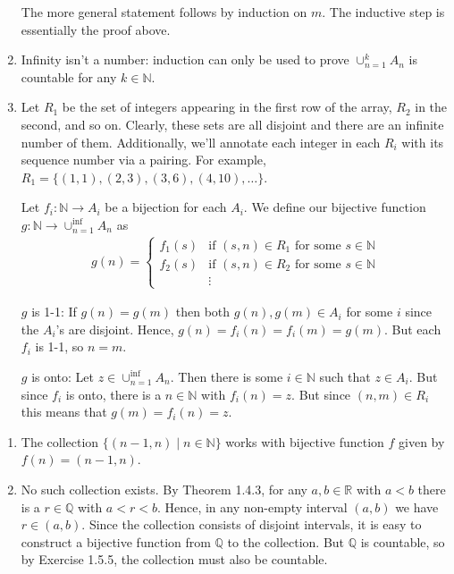 \documentclass[a4paper]{report}
\newenvironment{ex}[1]
    {\noindent{\large \bf Exercise #1.}}{\vspace{0.5cm}}
\begin{document}
\begin{ex}{1.5.3}
\begin{enumerate}[label=\alph*)]
   The more general statement follows by induction on $m$. The inductive step is
   essentially the proof above.
  \item Infinity isn't a number: induction can only be used to prove $\cup_{n=1}^k
    A_n$ is countable for any $k \in \mathbb{N}$.
  \item  Let $R_1$ be the set of integers appearing in the first row of the
    array, $R_2$ in the second, and so on.  Clearly, these sets are all disjoint
    and there are an infinite number of them. Additionally, we'll annotate each
    integer in each $R_i$ with its sequence number via a pairing. For example, $R_1
    = \{ (1, 1), (2, 3), (3, 6), (4, 10), \dots\}$.


    Let $f_i : \mathbb{N} \rightarrow A_i$ be a bijection for each $A_i$. We define our bijective function $g : \mathbb{N} \rightarrow
    \cup_{n=1}^{\inf}A_n$ as
    \begin{align*}
      g(n) = \begin{cases}
        f_1(s) & \text{if $(s, n) \in R_1$ for some $s \in \mathbb{N}$} \\
        f_2(s) & \text{if $(s, n) \in R_2$ for some $s \in \mathbb{N}$} \\
         & \vdots
      \end{cases}
    \end{align*}

  $g$ is 1-1: If $g(n) = g(m)$ then both $g(n),g(m) \in A_i$ for some $i$ since
  the $A_i$'s are disjoint. Hence, $g(n) = f_i(n) = f_i(m) = g(m)$. But each
  $f_i$ is 1-1, so $n = m$.

  $g$ is onto: Let $z \in \cup_{n=1}^{\inf}A_n$. Then there is some $i \in
  \mathbb{N}$ such that $z \in A_i$. But since $f_i$ is onto, there is a $n \in
  \mathbb{N}$ with $f_i(n) = z$. But since $(n, m) \in R_i$ this means that
  $g(m) = f_i(n) = z$. 
\end{enumerate}
\end{ex}
\begin{ex}{1.5.6}
  \begin{enumerate}[label=\alph*)]
    \item The collection $\{(n -1, n) \mid n \in \mathbb{N}\}$ works with
      bijective function $f$ given by $f(n) = (n-1, n)$.
    \item No such collection exists. By Theorem 1.4.3, for any $a, b \in
      \mathbb{R}$ with $a < b$ there is a $r \in \mathbb{Q}$ with $a < r < b$.
      Hence, in any non-empty interval $(a, b)$ we have $r \in (a, b)$. Since
      the collection consists of disjoint intervals, it is easy to construct a
      bijective function from $\mathbb{Q}$ to the collection. But $\mathbb{Q}$
      is countable, so by Exercise 1.5.5, the collection must also be countable.
  \end{enumerate}
\end{ex}
\end{document}
